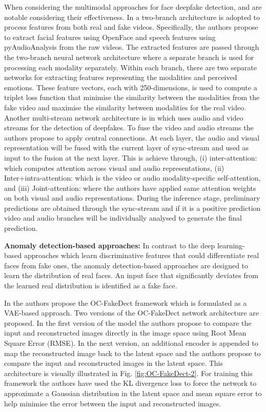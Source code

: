 When considering the multimodal approaches for face deepfake detection, \cite{mittal2020emotions} and \cite{zhou2021joint} are notable considering their effectiveness. In \cite{mittal2020emotions} a two-branch architecture is adopted to process features from both real and fake videos. Specifically, the authors propose to extract facial features using OpenFace \cite{baltruvsaitis2016openface} and speech features using pyAudioAnalysis \cite{giannakopoulos2015pyaudioanalysis} from the raw videos. The extracted features are passed through the two-branch neural network architecture where a separate branch is used for processing each modality separately. Within each branch, there are two separate networks for extracting features representing the modalities and perceived emotions. These feature vectors, each with 250-dimensions, is used to compute a triplet loss function that  minimise the similarity between the modalities from the fake video and maximise the similarity between modalities for the real video. Another multi-stream network architecture is in \cite{zhou2021joint} which uses audio and video streams for the detection of deepfakes. To fuse the video and audio streams the authors propose to apply central connections. At each layer, the audio and visual representation will be fused with the current layer of sync-stream and used as input to the fusion at the next layer. This is achieve through, (i) inter-attention: which computes attention across visual and audio representations, (ii) Inter+intra-attention: which is the video or audio modality-specific self-attention, and (iii) Joint-attention: where the authors have applied same attention weights on both visual and audio representations. During the inference stage, preliminary predictions are obtained through the sync-stream and if it is a positive prediction video and audio branches will be individually analysed to generate the final prediction.

\noindent\textbf{Anomaly detection-based approaches: } In contrast to the deep learning-based approaches which learn discriminative features that could differentiate real faces from fake ones, the anomaly detection-based approaches are designed to learn the distribution of real faces. An input face that significantly deviates from the learned real distribution is identified as a fake face. 

In \cite{khalid2020oc} the authors propose the OC-FakeDect framework which is formulated as a VAE-based approach. Two versions of the OC-FakeDect network architecture are proposed. In the first version of the model the authors propose to compare the input and reconstructed images directly in the image space using Root Mean Square Error (RMSE). In the next version, an additional encoder is appended to map the reconstructed image back to the latent space and the authors propose to compare the input and reconstructed images in the latent space. This architecture is visually illustrated in Fig. \ref{fig:OC-FakeDect-2}. For training this framework the authors have used the KL divergence loss to force the network to approximate a Gaussian distribution in the latent space and mean square error to help minimise the error between the input and reconstructed images. 

